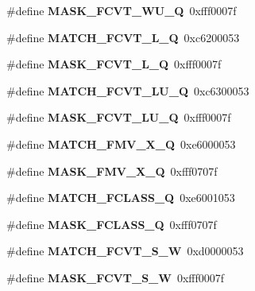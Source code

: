 \begin{DoxyCompactItemize}
\#define {\bfseries M\+A\+S\+K\+\_\+\+F\+C\+V\+T\+\_\+\+W\+U\+\_\+Q}~0xfff0007f
\item 
\mbox{\label{riscv-utility_8h_a8352ae956bae4ad0d4068e7c10f6968c}} 
\#define {\bfseries M\+A\+T\+C\+H\+\_\+\+F\+C\+V\+T\+\_\+\+L\+\_\+Q}~0xc6200053
\item 
\mbox{\label{riscv-utility_8h_a501c33951eea0cdc81aa8ccf6d8f8186}} 
\#define {\bfseries M\+A\+S\+K\+\_\+\+F\+C\+V\+T\+\_\+\+L\+\_\+Q}~0xfff0007f
\item 
\mbox{\label{riscv-utility_8h_a55eb7104a82f3b18265757523a069852}} 
\#define {\bfseries M\+A\+T\+C\+H\+\_\+\+F\+C\+V\+T\+\_\+\+L\+U\+\_\+Q}~0xc6300053
\item 
\mbox{\label{riscv-utility_8h_a2f22213f4c99b95ab175aa3c4fa5b733}} 
\#define {\bfseries M\+A\+S\+K\+\_\+\+F\+C\+V\+T\+\_\+\+L\+U\+\_\+Q}~0xfff0007f
\item 
\mbox{\label{riscv-utility_8h_ade9422e167705106c51dc20dc58274b7}} 
\#define {\bfseries M\+A\+T\+C\+H\+\_\+\+F\+M\+V\+\_\+\+X\+\_\+Q}~0xe6000053
\item 
\mbox{\label{riscv-utility_8h_ab7e2069a5a1f1bffac59da1268e96028}} 
\#define {\bfseries M\+A\+S\+K\+\_\+\+F\+M\+V\+\_\+\+X\+\_\+Q}~0xfff0707f
\item 
\mbox{\label{riscv-utility_8h_a20c61179bb5f19a07500911e63ece441}} 
\#define {\bfseries M\+A\+T\+C\+H\+\_\+\+F\+C\+L\+A\+S\+S\+\_\+Q}~0xe6001053
\item 
\mbox{\label{riscv-utility_8h_a74e524c5b9589840df09c2230f5ee7fc}} 
\#define {\bfseries M\+A\+S\+K\+\_\+\+F\+C\+L\+A\+S\+S\+\_\+Q}~0xfff0707f
\item 
\mbox{\label{riscv-utility_8h_a6d07c4cb325ff35781542a7f7214a33e}} 
\#define {\bfseries M\+A\+T\+C\+H\+\_\+\+F\+C\+V\+T\+\_\+\+S\+\_\+W}~0xd0000053
\item 
\mbox{\label{riscv-utility_8h_ad0545a8d32c7f0145fa9fdb861cd80e7}} 
\#define {\bfseries M\+A\+S\+K\+\_\+\+F\+C\+V\+T\+\_\+\+S\+\_\+W}~0xfff0007f

\end{DoxyCompactItemize}
